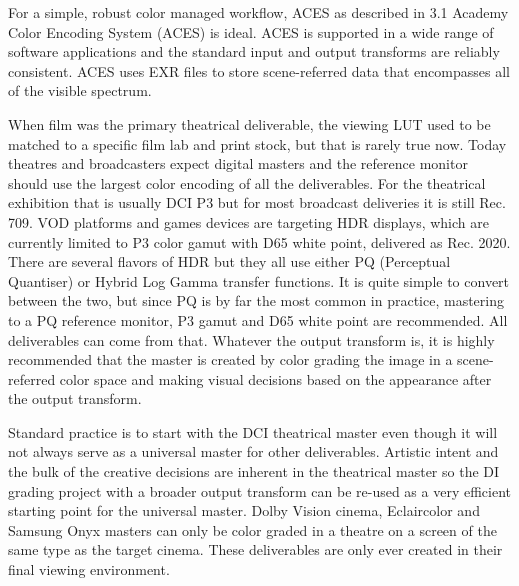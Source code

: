 For a simple, robust color managed workflow, ACES as described in 3.1 Academy Color Encoding System (ACES) is ideal. ACES is supported in a wide range of software applications and the standard input and output transforms are reliably consistent. ACES uses EXR files to store scene-referred data that encompasses all of the visible spectrum.

When film was the primary theatrical deliverable, the viewing LUT used to be matched to a specific film lab and print stock, but that is rarely true now. Today theatres and broadcasters expect digital masters and the reference monitor should use the largest color encoding of all the deliverables. For the theatrical exhibition that is usually DCI P3 but for most broadcast deliveries it is still Rec. 709. VOD platforms and games devices are targeting HDR displays, which are currently limited to P3 color gamut with D65 white point, delivered as Rec. 2020. There are several flavors of HDR but they all use either PQ (Perceptual Quantiser) or Hybrid Log Gamma transfer functions. It is quite simple to convert between the two, but since PQ is by far the most common in practice, mastering to a PQ reference monitor, P3 gamut and D65 white point are recommended. All deliverables can come from that. Whatever the output transform is, it is highly recommended that the master is created by color grading the image in a scene-referred color space and making visual decisions based on the appearance after the output transform.

Standard practice is to start with the DCI theatrical master even though it will not always serve as a universal master for other deliverables. Artistic intent and the bulk of the creative decisions are inherent in the theatrical master so the DI grading project with a broader output transform can be re-used as a very efficient starting point for the universal master. Dolby Vision cinema, Eclaircolor and Samsung Onyx masters can only be color graded in a theatre on a screen of the same type as the target cinema. These deliverables are only ever created in their final viewing environment.



